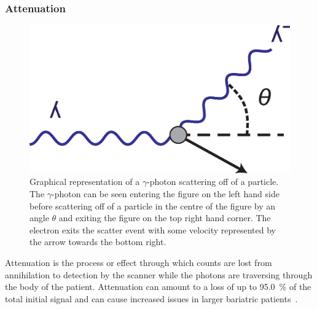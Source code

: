             \subsubsection{Attenuation} \label{sec:attenuation}
                \begin{figure}
                    \centering
                    
                    \includegraphics[width=1.0\linewidth]{figures/background_scatter.png}
                    
                    \captionsetup{singlelinecheck=false, justification=raggedright}
                    \caption{Graphical representation of a $\gamma$-photon scattering off of a particle. The $\gamma$-photon can be seen entering the figure on the left hand side before scattering off of a particle in the centre of the figure by an angle $\theta$ and exiting the figure on the top right hand corner. The electron exits the scatter event with some velocity represented by the arrow towards the bottom right. 
                    } \label{fig:attenuation_scatter}
                \end{figure}
                
                Attenuation is the process or effect through which counts are lost from annihilation to detection by the scanner while the photons are traversing through the body of the patient. Attenuation can amount to a loss of up to \SI{95.0}{\percent} of the total initial signal and can cause increased issues in larger bariatric patients~\parencite{petspringer, Essential2012}. %
                
